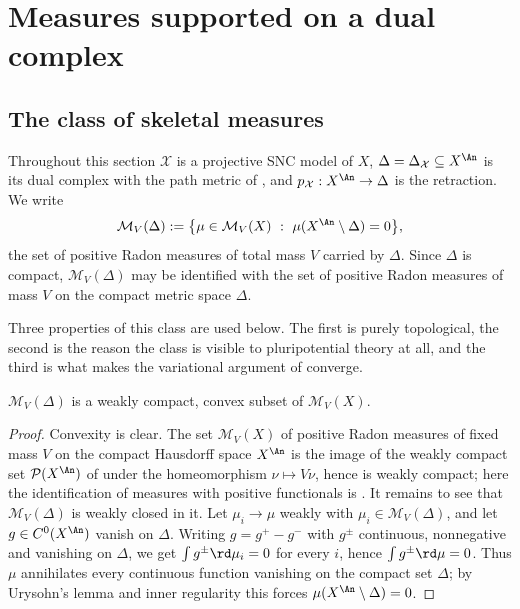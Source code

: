 \section{Measures supported on a dual complex}
\label{sec:ch29-supported}

\subsection{The class of skeletal measures}
\label{sec:ch29-skeletal-class}

Throughout this section \(\mathcal X\) is a projective SNC model of \(X\),
\(\Delta=\Delta_{\mathcal X}\subseteq X^{\An}\) is its dual complex with the
path metric of , and
\(p_{\mathcal X}:X^{\An}\to\Delta\) is the retraction.  We write
\begin{equation}
\label{eq:ch29-skeletal-measures}
 \mathcal M_V(\Delta)
 :=\bigl\{\mu\in\mathcal M_V(X)\ :\ \mu(X^{\An}\setminus\Delta)=0\bigr\},
\end{equation}
the set of positive Radon measures of total mass \(V\) carried by
\(\Delta\).  Since \(\Delta\) is compact, \(\mathcal M_V(\Delta)\) may be
identified with the set of positive Radon measures of mass \(V\) on the
compact metric space \(\Delta\).

Three properties of this class are used below.  The first is purely
topological, the second is the reason the class is visible to
pluripotential theory at all, and the third is what makes the variational
argument of  converge.

\begin{proposition}
\label{prop:ch29-skeletal-compact}
\(\mathcal M_V(\Delta)\) is a weakly compact, convex subset of
\(\mathcal M_V(X)\).
\end{proposition}

\begin{proof}
Convexity is clear.  The set \(\mathcal M_V(X)\) of positive Radon measures
of fixed mass \(V\) on the compact Hausdorff space \(X^{\An}\) is the image
of the weakly compact set \(\mathcal P(X^{\An})\) of
 under the homeomorphism
\(\nu\mapsto V\nu\), hence is weakly compact; here the identification of
measures with positive functionals is
.  It remains to see that
\(\mathcal M_V(\Delta)\) is weakly closed in it.  Let \(\mu_i\to\mu\)
weakly with \(\mu_i\in\mathcal M_V(\Delta)\), and let
\(g\in C^0(X^{\An})\) vanish on \(\Delta\).  Writing
\(g=g^+-g^-\) with \(g^\pm\) continuous, nonnegative and vanishing on
\(\Delta\), we get \(\int g^\pm\rd\mu_i=0\) for every \(i\), hence
\(\int g^\pm\rd\mu=0\).  Thus \(\mu\) annihilates every continuous function
vanishing on the compact set \(\Delta\); by Urysohn's lemma and inner
regularity this forces \(\mu(X^{\An}\setminus\Delta)=0\).
\end{proof}

